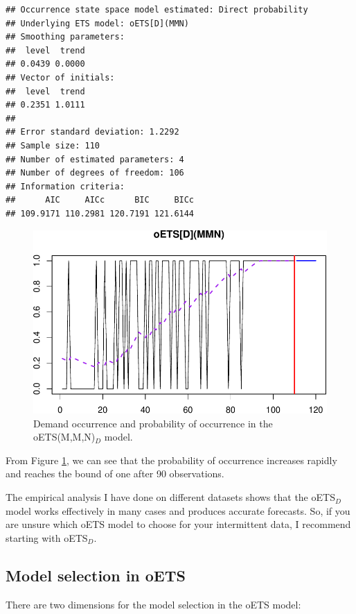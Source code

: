 \documentclass[]{book}
\theoremstyle{definition}
\theoremstyle{definition}
\theoremstyle{definition}
\theoremstyle{definition}
\theoremstyle{remark}
\begin{document}
\begin{verbatim}
## Occurrence state space model estimated: Direct probability
## Underlying ETS model: oETS[D](MMN)
## Smoothing parameters:
##  level  trend 
## 0.0439 0.0000 
## Vector of initials:
##  level  trend 
## 0.2351 1.0111 
## 
## Error standard deviation: 1.2292
## Sample size: 110
## Number of estimated parameters: 4
## Number of degrees of freedom: 106
## Information criteria: 
##      AIC     AICc      BIC     BICc 
## 109.9171 110.2981 120.7191 121.6144
\end{verbatim}

\begin{figure}
\centering
\includegraphics{Svetunkov--2022----ADAM_files/figure-latex/oETSDModel-1.pdf}
\caption{\label{fig:oETSDModel}Demand occurrence and probability of occurrence in the oETS(M,M,N)\(_D\) model.}
\end{figure}

From Figure \ref{fig:oETSDModel}, we can see that the probability of occurrence increases rapidly and reaches the bound of one after 90 observations.

The empirical analysis I have done on different datasets shows that the oETS\(_D\) model works effectively in many cases and produces accurate forecasts. So, if you are unsure which oETS model to choose for your intermittent data, I recommend starting with oETS\(_D\).

\hypertarget{oETSModelSelection}{%
\subsection{Model selection in oETS}\label{oETSModelSelection}}

There are two dimensions for the model selection in the oETS model:
\end{document}
